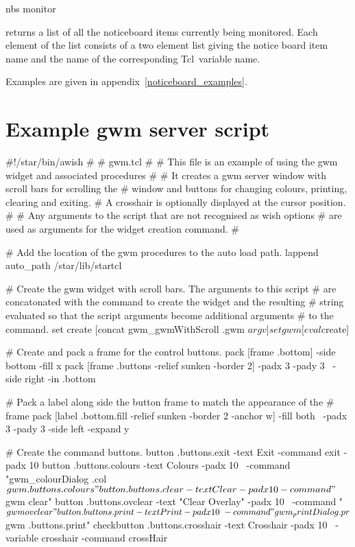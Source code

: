 \documentclass[twoside,11pt,nolof]{starlink}
\providecommand{\Tcl}{{\textsf{Tcl}}}
\begin{document}
\begin{terminalv}
nbs monitor
\end{terminalv}
returns a list of all the noticeboard items currently being monitored.
Each element of the list consists of a two element list giving the
notice board item name and the name of the corresponding \Tcl\ variable name.

Examples are given in appendix~\ref{noticeboard_examples}.

\newpage
\appendix
\section{\label{example_gwm_server_script}Example gwm server script}

\begin{small}
\begin{terminalv}
#!/star/bin/awish
#
# gwm.tcl
#
# This file is an example of using the gwm widget and associated procedures
#
# It creates a gwm server window with scroll bars for scrolling the
# window and buttons for changing colours, printing, clearing and exiting.
# A crosshair is optionally displayed at the cursor position.
#
# Any arguments to the script that are not recognised as wish options
# are used as arguments for the widget creation command.
#

# Add the location of the gwm procedures to the auto load path.
    lappend auto_path /star/lib/startcl

# Create the gwm widget with scroll bars. The arguments to this script
# are concatonated with the command to create the widget and the resulting
# string evaluated so that the script arguments become additional arguments
# to the command.
    set create [concat {gwm_gwmWithScroll .gwm} $argv]
    set gwm [eval $create]

# Create and pack a frame for the control buttons.
    pack [frame .bottom] -side bottom -fill x
    pack [frame .buttons -relief sunken -border 2] -padx 3 -pady 3 \
	-side right -in .bottom

# Pack a label along side the button frame to match the appearance of the
# frame
    pack [label .bottom.fill -relief sunken -border 2 -anchor w] -fill both \
	-padx 3 -pady 3 -side left -expand y

# Create the command buttons.
    button .buttons.exit -text Exit -command exit -padx 10
    button .buttons.colours -text Colours -padx 10 \
	-command "gwm_colourDialog .col $gwm .buttons.colours"
    button .buttons.clear -text Clear -padx 10 -command "$gwm clear"
    button .buttons.ovclear -text "Clear Overlay" -padx 10 \
	-command "$gwm ovclear"
    button .buttons.print -text Print -padx 10 \
	-command "gwm_printDialog .pr $gwm .buttons.print"
    checkbutton .buttons.crosshair -text Crosshair -padx 10 \
	-variable crosshair -command crossHair


\end{terminalv}
\end{small}
\end{document}
